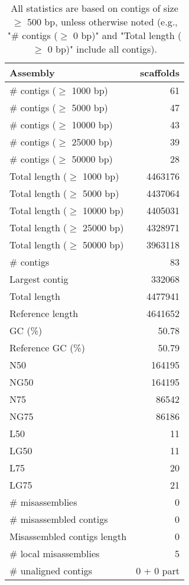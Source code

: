 \documentclass[12pt,a4paper]{article}
\begin{document}
\begin{table}[ht]
\begin{center}
\caption{All statistics are based on contigs of size $\geq$ 500 bp, unless otherwise noted (e.g., "\# contigs ($\geq$ 0 bp)" and "Total length ($\geq$ 0 bp)" include all contigs).}
\begin{tabular}{|l*{1}{|r}|}
\hline
Assembly & scaffolds \\ \hline
\# contigs ($\geq$ 1000 bp) & 61 \\ \hline
\# contigs ($\geq$ 5000 bp) & 47 \\ \hline
\# contigs ($\geq$ 10000 bp) & 43 \\ \hline
\# contigs ($\geq$ 25000 bp) & 39 \\ \hline
\# contigs ($\geq$ 50000 bp) & 28 \\ \hline
Total length ($\geq$ 1000 bp) & 4463176 \\ \hline
Total length ($\geq$ 5000 bp) & 4437064 \\ \hline
Total length ($\geq$ 10000 bp) & 4405031 \\ \hline
Total length ($\geq$ 25000 bp) & 4328971 \\ \hline
Total length ($\geq$ 50000 bp) & 3963118 \\ \hline
\# contigs & 83 \\ \hline
Largest contig & 332068 \\ \hline
Total length & 4477941 \\ \hline
Reference length & 4641652 \\ \hline
GC (\%) & 50.78 \\ \hline
Reference GC (\%) & 50.79 \\ \hline
N50 & 164195 \\ \hline
NG50 & 164195 \\ \hline
N75 & 86542 \\ \hline
NG75 & 86186 \\ \hline
L50 & 11 \\ \hline
LG50 & 11 \\ \hline
L75 & 20 \\ \hline
LG75 & 21 \\ \hline
\# misassemblies & 0 \\ \hline
\# misassembled contigs & 0 \\ \hline
Misassembled contigs length & 0 \\ \hline
\# local misassemblies & 5 \\ \hline
\# unaligned contigs & 0 + 0 part \\ \hline

\end{tabular}
\end{center}
\end{table}
\end{document}
